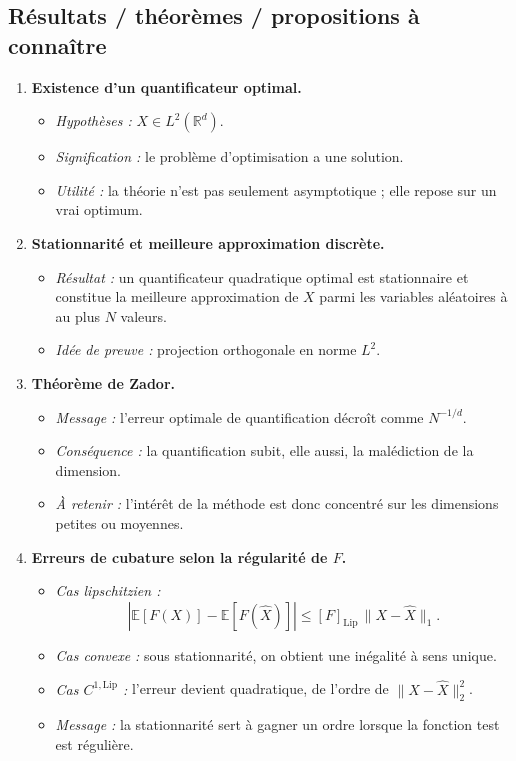 \documentclass[11pt,a4paper]{article}
\newcommand{\E}{\mathbb{E}}
\newcommand{\R}{\mathbb{R}}
\newcommand{\Lip}{\mathrm{Lip}}
\begin{document}
\subsection{Résultats / théorèmes / propositions à connaître}

\begin{enumerate}[label=\textbf{\arabic*.}]
  \item \textbf{Existence d'un quantificateur optimal.}
  \begin{itemize}
    \item \emph{Hypothèses :} $X\in L^2(\R^d)$.
    \item \emph{Signification :} le problème d'optimisation a une solution.
    \item \emph{Utilité :} la théorie n'est pas seulement asymptotique ; elle repose sur un vrai optimum.
  \end{itemize}

  \item \textbf{Stationnarité et meilleure approximation discrète.}
  \begin{itemize}
    \item \emph{Résultat :} un quantificateur quadratique optimal est stationnaire et constitue la meilleure approximation de $X$ parmi les variables aléatoires à au plus $N$ valeurs.
    \item \emph{Idée de preuve :} projection orthogonale en norme $L^2$.
  \end{itemize}

  \item \textbf{Théorème de Zador.}
  \begin{itemize}
    \item \emph{Message :} l'erreur optimale de quantification décroît comme $N^{-1/d}$.
    \item \emph{Conséquence :} la quantification subit, elle aussi, la malédiction de la dimension.
    \item \emph{À retenir :} l'intérêt de la méthode est donc concentré sur les dimensions petites ou moyennes.
  \end{itemize}

  \item \textbf{Erreurs de cubature selon la régularité de $F$.}
  \begin{itemize}
    \item \emph{Cas lipschitzien :}
    \[
      |\E[F(X)]-\E[F(\hat X)]|\le [F]_{\Lip}\,\|X-\hat X\|_1.
    \]
    \item \emph{Cas convexe :} sous stationnarité, on obtient une inégalité à sens unique.
    \item \emph{Cas $C^{1,\Lip}$ :} l'erreur devient quadratique, de l'ordre de $\|X-\hat X\|_2^2$.
    \item \emph{Message :} la stationnarité sert à gagner un ordre lorsque la fonction test est régulière.
  \end{itemize}


\end{enumerate}
\end{document}
